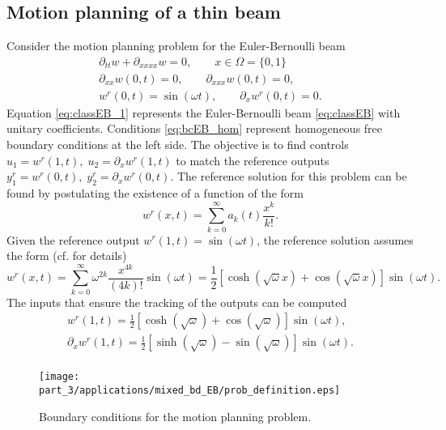 \subsection{Motion planning of a thin beam}
Consider the motion planning problem for the Euler-Bernoulli beam \cite[Chapter 12]{krstic2008boundary}
\begin{align}
\partial_{tt} w + \partial_{xxxx} w = 0,  \qquad x\in \Omega=\{0, 1\} \label{eq:classEB_1}\\
\partial_{xx} w(0, t) = 0, \qquad \partial_{xxx} w (0, t) = 0, \label{eq:bcEB_hom}\\
w^r(0, t) = \sin(\omega t), \qquad \partial_x w^r(0, t) = 0. \label{eq:bcEB_r}
\end{align}
Equation \eqref{eq:classEB_1} represents the Euler-Bernoulli beam \eqref{eq:classEB} with unitary coefficients. Conditions \eqref{eq:bcEB_hom} represent homogeneous free boundary conditions at the left side. The objective is to find controls $u_1 = w^r(1, t), \; u_2 =\partial_x w^r(1, t)$ to match the reference outputs $y_1^r = w^r(0, t), \; y_2^r=\partial_x w^r(0, t)$. The reference solution for this problem can be found by postulating the existence of a function of the form
\begin{equation*}
	w^r(x, t) = \sum_{k=0}^{\infty} a_k(t) \frac{x^k}{k !}.
\end{equation*}
Given the reference output $w^r(1, t)= \sin(\omega t)$, the reference solution assumes the form (cf. \cite[Chapter 12]{krstic2008boundary} for details)
\begin{equation}\label{eq:refsol_EB}
w^r(x, t) = \sum_{k=0}^{\infty} \omega^{2k} \frac{x^{4k}}{(4k)!}\sin(\omega t) = \frac{1}{2}[\cosh(\sqrt{\omega} x) + \cos(\sqrt{\omega} x)]\sin(\omega t).
\end{equation}
The inputs that ensure the tracking of the outputs can be computed
\begin{equation}
\begin{aligned}
w^r(1, t) = \frac{1}{2}[\cosh(\sqrt{\omega}) + \cos(\sqrt{\omega})]\sin(\omega t), \\
\partial_x w^r(1, t) = \frac{1}{2}[\sinh(\sqrt{\omega}) - \sin(\sqrt{\omega})]\sin(\omega t). \\
\end{aligned}
\end{equation}

\begin{figure}[t]%
	\centering
	\texttt{[image: part\_3/applications/mixed\_bd\_EB/prob\_definition.eps]} \\
	\caption{Boundary conditions for the motion planning problem.}
	\label{fig:prob_def_EB}
\end{figure}

